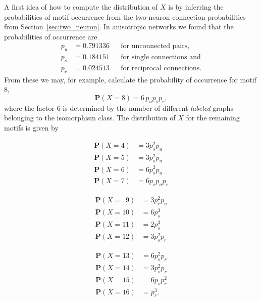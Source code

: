 A first idea of how to compute the distribution of
$X$ is by inferring the probabilities of motif occurrence from the
two-neuron connection probabilities from
Section~\ref{sec:two_neuron}. In anisotropic networks we found that
the probabilities of occurrence are
\begin{align*} 
  p_u & = 0.791336     &&\text{for unconnected pairs,}     \\
  p_s & = 0.184151     &&\text{for single connections and} \\
  p_r & = 0.024513     &&\text{for reciprocal connections.}
\end{align*}
From these we may, for example, calculate the probability of
occurrence for motif 8, 
\[
  \mathbf{P}(X=8) = 6\, p_{u} p_{s} p_{r},
\]
where the factor 6 is determined by the number of different
\textit{labeled} graphs belonging to the isomorphism class. The
distribution of $X$ for the remaining motifs is given by
%
\vspace{-0.9cm}
\begin{figure}[H]
  \begin{minipage}[c]{0.32\textwidth}
    \begin{align*}
      \mathbf{P}(X=4) &    =   3 p_s^2 p_u\\
      \mathbf{P}(X=5) &    =   3 p_s^2 p_u\\
      \mathbf{P}(X=6) &    =   6 p_s^2 p_u\\
      \mathbf{P}(X=7) &    =   6 p_s p_u p_r
    \end{align*}
  \end{minipage}%
  \begin{minipage}[c]{0.32\textwidth}
    \begin{align*}
      \mathbf{P}(X=\,\,\,9) &    =   3 p_r^2 p_u\\
      \mathbf{P}(X=10) &   =   6 p_s^3   \\
      \mathbf{P}(X=11) &   =   2 p_s^3    \\
      \mathbf{P}(X=12) &   =   3 p_s^2 p_r
    \end{align*}
  \end{minipage}%
  \begin{minipage}[c]{0.32\textwidth}
    \begin{align*}
      \mathbf{P}(X=13) &   =   6 p_s^2 p_r\\
      \mathbf{P}(X=14) &   =   3 p_s^2 p_r\\
      \mathbf{P}(X=15) &   =   6 p_s p_r^2\\
      \mathbf{P}(X=16) &   =   p_r^3.
    \end{align*}
  \end{minipage}  
  \vspace{-0.9cm}
\end{figure}

